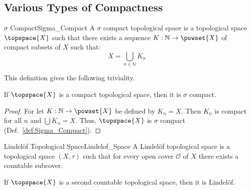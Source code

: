\documentclass{article}                                                        %
\begin{document}
        \subsection{Various Types of Compactness}
            \begin{fdefinition}{$\sigma$ Compact}{Sigma_Compact}
                A $\sigma$ compact topological space is a topological space
                $\topspace{X}$ such that there exists a sequence
                $K:\mathbb{N}\rightarrow\powset{X}$ of compact subsets of $X$ such
                that:
                \begin{equation*}
                    X=\bigcup_{n\in\mathbb{N}}K_{n}
                \end{equation*}
            \end{fdefinition}
            This definition gives the following triviality.
            \begin{theorem}
                \label{thm:Compact_Implies_Sigma_Compact}%
                If $\topspace{X}$ is a compact topological space, then it is
                $\sigma$ compact.
            \end{theorem}
            \begin{proof}
                For let $K:\mathbb{N}\rightarrow\powset{X}$ be defined by
                $K_{n}=X$. Then $K_{n}$ is compact for all $n$ and
                $\bigcup{K}_{n}=X$. Thus, $\topspace{X}$ is $\sigma$ compact
                (Def.~\ref{def:Sigma_Compact}).
            \end{proof}
            \begin{fdefinition}{Lindel\"{o}f Topological Space}{Lindelof_Space}
                A Lindel\"{o}f topological space is a topological space $(X,\tau)$
                such that for every open cover $\mathcal{O}$ of $X$ there exists a
                countable subcover.
            \end{fdefinition}
            \begin{theorem}
                \label{thm:Second_Countable_Implies_Lindelof}%
                If $\topspace{X}$ is a second countable topological space, then it
                is Lindel\"{o}f.
            \end{theorem}
\end{document}
